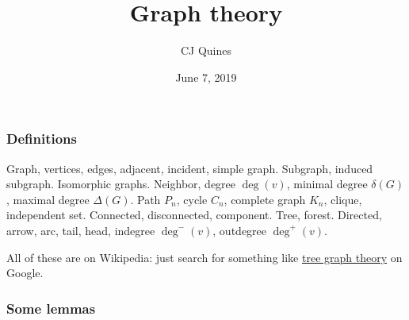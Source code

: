 \documentclass[11pt,paper=letter]{scrartcl}
\begin{document}
\title{Graph theory}
\author{CJ Quines}
\date{June 7, 2019}

\maketitle

\subsubsection*{Definitions}

Graph, vertices, edges, adjacent, incident, simple graph. Subgraph, induced subgraph. Isomorphic graphs. Neighbor, degree $\deg(v)$, minimal degree $\delta(G)$, maximal degree $\Delta(G)$. Path $P_n$, cycle $C_n$, complete graph $K_n$, clique, independent set. Connected, disconnected, component. Tree, forest. Directed, arrow, arc, tail, head, indegree $\deg^-(v)$, outdegree $\deg^+(v)$.

All of these are on Wikipedia: just search for something like \href{https://www.google.com/search?q=tree+graph+theory}{tree graph theory} on Google.

\subsubsection*{Some lemmas}
\end{document}
